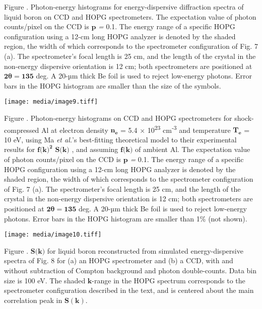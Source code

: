 Figure . Photon-energy histograms for energy-dispersive diffraction
spectra of liquid boron on CCD and HOPG spectrometers. The expectation
value of photon counts/pixel on the CCD is \(\mathbf{p}\) \emph{=} 0.1.
The energy range of a specific HOPG configuration using a 12-cm long
HOPG analyzer is denoted by the shaded region, the width of which
corresponds to the spectrometer configuration of Fig. 7 (a). The
spectrometer's focal length is 25 cm, and the length of the crystal in
the non-energy dispersive orientation is 12 cm; both spectrometers are
positioned at \(\mathbf{2\theta = 135}\) deg. A 20-µm thick Be foil is
used to reject low-energy photons. Error bars in the HOPG histogram are
smaller than the size of the symbols.

\texttt{[image: media/image9.tiff]}

Figure . Photon-energy histograms on
CCD and HOPG spectrometers for shock-compressed Al at electron density
\(\mathbf{n}_{\mathbf{e}}\) = 5.4 × 10\textsuperscript{23}
cm\textsuperscript{-3} and temperature \(\mathbf{T}_{\mathbf{e}}\) = 10
eV, using Ma \emph{et al.}'s best-fitting theoretical model to their
experimental results for
\({\mathbf{f}\mathbf{(}\mathbf{k}\mathbf{)}}^{\mathbf{2}}\)
\(\mathbf{S}\mathbf{(}\mathbf{k}\mathbf{)}\)
\hyperref[t.-ma-et-al.-physical-review-letters-110-065001-2013.]\cite{MA2013X},
and assuming \(\mathbf{f}\mathbf{(}\mathbf{k}\mathbf{)}\) of ambient Al.
The expectation value of photon counts/pixel on the CCD is
\(\mathbf{p}\) \emph{=} 0.1. The energy range of a specific HOPG
configuration using a 12-cm long HOPG analyzer is denoted by the shaded
region, the width of which corresponds to the spectrometer configuration
of Fig. 7 (a). The spectrometer's focal length is 25 cm, and the length
of the crystal in the non-energy dispersive orientation is 12 cm; both
spectrometers are positioned at \(\mathbf{2\theta = 135}\) deg. A 20-µm
thick Be foil is used to reject low-energy photons. Error bars in the
HOPG histogram are smaller than 1\% (not shown).

\texttt{[image: media/image10.tiff]}

Figure .
\(\mathbf{S}\mathbf{(}\mathbf{k}\mathbf{)}\) for liquid boron
reconstructed from simulated energy-dispersive spectra of Fig. 8 for (a)
an HOPG spectrometer and (b) a CCD, with and without subtraction of
Compton background and photon double-counts. Data bin size is 100 eV.
The shaded \(\mathbf{k}\)-range in the HOPG spectrum corresponds to the
spectrometer configuration described in the text, and is centered about
the main correlation peak in \(\mathbf{S(k)}\).

